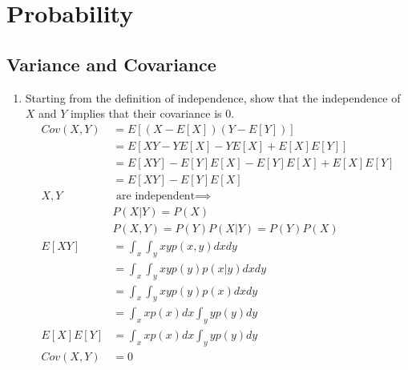 \documentclass[12pt,letter]{article}
\begin{document}

\section{Probability}
\subsection{Variance and Covariance}
\begin{enumerate}
\item Starting from the definition of independence, show that the independence of $X$ and $Y$ implies that their covariance is $0$.
  \begin{align*}
    Cov(X,Y)&=E[(X-E[X])(Y-E[Y])]\\
            &=E[XY-YE[X]-YE[X]+E[X]E[Y]]\\
            &=E[XY]-E[Y]E[X]-E[Y]E[X]+E[X]E[Y]\\
            &=E[XY]-E[Y]E[X]\\
    X,Y & \text{ are independent} \implies\\
            & P(X|Y)=P(X)\\
            & P(X,Y)=P(Y)P(X|Y)= P(Y)P(X)\\
    E[XY] &= \int_x \int_y xy p(x,y) dxdy\\
            &= \int_x \int_y xy p(y)p(x|y) dxdy\\
            &= \int_x \int_y xy p(y)p(x) dxdy\\
            &= \int_x x p(x) dx \int_y y p(y) dy\\
    E[X]E[Y] &= \int_x xp(x) dx \int_y yp(y) dy\\
    Cov(X,Y)&=0\\
  \end{align*}

  \pagebreak
  

\end{enumerate}
\end{document}
